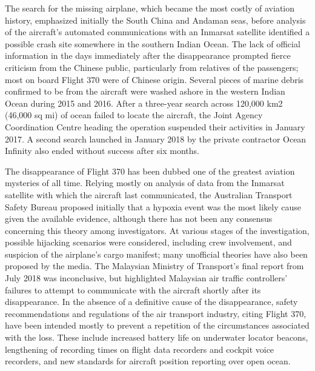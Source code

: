 \documentclass[a4paper,10pt]{article}
\begin{document}
The search for the missing airplane, which became the most costly of aviation history, emphasized initially the South China and Andaman seas, before analysis of the aircraft's automated communications with an Inmarsat satellite identified a possible crash site somewhere in the southern Indian Ocean. The lack of official information in the days immediately after the disappearance prompted fierce criticism from the Chinese public, particularly from relatives of the passengers; most on board Flight 370 were of Chinese origin. Several pieces of marine debris confirmed to be from the aircraft were washed ashore in the western Indian Ocean during 2015 and 2016. After a three-year search across 120,000 km2 (46,000 sq mi) of ocean failed to locate the aircraft, the Joint Agency Coordination Centre heading the operation suspended their activities in January 2017. A second search launched in January 2018 by the private contractor Ocean Infinity also ended without success after six months.\par

The disappearance of Flight 370 has been dubbed one of the greatest aviation mysteries of all time. Relying mostly on analysis of data from the Inmarsat satellite with which the aircraft last communicated, the Australian Transport Safety Bureau proposed initially that a hypoxia event was the most likely cause given the available evidence, although there has not been any consensus concerning this theory among investigators. At various stages of the investigation, possible hijacking scenarios were considered, including crew involvement, and suspicion of the airplane's cargo manifest; many unofficial theories have also been proposed by the media. The Malaysian Ministry of Transport's final report from July 2018 was inconclusive, but highlighted Malaysian air traffic controllers' failures to attempt to communicate with the aircraft shortly after its disappearance. In the absence of a definitive cause of the disappearance, safety recommendations and regulations of the air transport industry, citing Flight 370, have been intended mostly to prevent a repetition of the circumstances associated with the loss. These include increased battery life on underwater locator beacons, lengthening of recording times on flight data recorders and cockpit voice recorders, and new standards for aircraft position reporting over open ocean. \par
\end{document}

